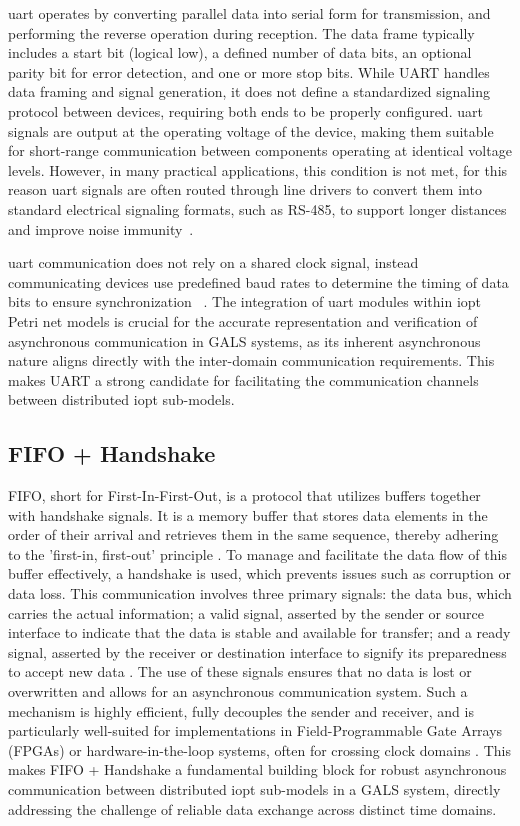 \gls{uart} operates by converting parallel data into serial form for transmission, and performing the reverse operation during reception. The data frame typically includes a start bit (logical low), a defined number of data bits, an optional parity bit for error detection, and one or more stop bits. While UART handles data framing and signal generation, it does not define a standardized signaling protocol between devices, requiring both ends to be properly configured. \gls{uart} signals are output at the operating voltage of the device, making them suitable for short-range communication between components operating at identical voltage levels. However, in many practical applications, this condition is not met, for this reason  \gls{uart} signals are often routed through line drivers to convert them into standard electrical signaling formats, such as RS-485, to support longer distances and improve noise immunity~\cite{Rao2021}.

\gls{uart} communication does not rely on a shared clock signal, instead communicating devices use predefined baud rates to determine the timing of data bits to ensure synchronization ~\cite{UARTard}. The integration of \gls{uart} modules within \gls{iopt} Petri net models is crucial for the accurate representation and verification of asynchronous communication in GALS systems, as its inherent asynchronous nature aligns directly with the inter-domain communication requirements. This makes UART a strong candidate for facilitating the communication channels between distributed \gls{iopt} sub-models. 




\subsection{FIFO +  Handshake}
\label{sub:fifo+handshake}

FIFO, short for First-In-First-Out, is a protocol that utilizes buffers together with handshake signals. It is a memory buffer that stores data elements in the order of their arrival and retrieves them in the same sequence, thereby adhering to the 'first-in, first-out' principle \cite{wakerly2006}. To manage and facilitate the data flow of this buffer effectively, a handshake is used, which prevents issues such as corruption or data loss. This communication involves three primary signals: the data bus, which carries the actual information; a valid signal, asserted by the sender or source interface to indicate that the data is stable and available for transfer; and a ready signal, asserted by the receiver or destination interface to signify its preparedness to accept new data \cite{arm_axi}. The use of these signals ensures that no data is lost or overwritten and allows for an asynchronous communication system. Such a mechanism is highly efficient, fully decouples the sender and receiver, and is particularly well-suited for implementations in Field-Programmable Gate Arrays (FPGAs) or hardware-in-the-loop systems, often for crossing clock domains \cite{bening2002}. This makes FIFO + Handshake a fundamental building block for robust asynchronous communication between distributed \gls{iopt} sub-models in a GALS system, directly addressing the challenge of reliable data exchange across distinct time domains.



